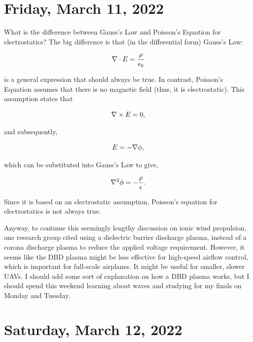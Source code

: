 \documentclass[12pt]{report}
\begin{document}
\section{Friday, March 11, 2022}

\par
What is the difference between Gauss's Law and Poisson's Equation for electrostatics? The big difference is that (in the differential form) Gauss's Law:

\begin{equation}
\centering
\nabla \cdot E = \frac{\rho}{\epsilon_0}
\end{equation}

is a general expression that should always be true. In contrast, Poisson's Equation assumes that there is no magnetic field (thus, it is electrostatic). This assumption states that 

\begin{equation}
\centering
\nabla \times E = 0,
\end{equation}

and subsequently,

\begin{equation}
\centering
E = - \nabla \phi,
\end{equation}

which can be substituted into Gauss's Law to give,

\begin{equation}
\centering
\nabla^2\phi = -\frac{\rho}{\epsilon}.
\end{equation}

Since it is based on an electrostatic assumption, Poisson's equation for electrostatics is not always true. 

\par
Anyway, to continue this seemingly lengthy discussion on ionic wind propulsion, one research group cited using a dielectric barrier discharge plasma, instead of a corona discharge plasma to reduce the applied voltage requirement. However, it seems like the DBD plasma might be less effective for high-speed airflow control, which is important for full-scale airplanes.  It might be useful for smaller, slower UAVs. I should add some sort of explanation on how a DBD plasma works, but I should spend this weekend learning about waves and studying for my finals on Monday and Tuesday. 


\section{Saturday, March 12, 2022}
\end{document}
